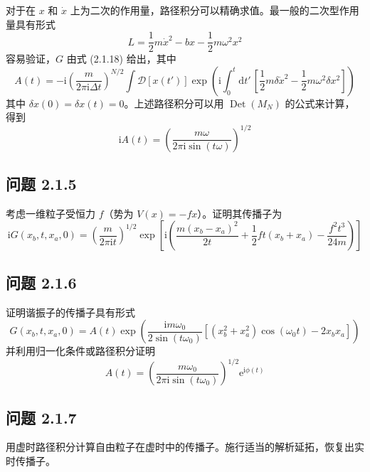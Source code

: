 对于在 $x$ 和 $\dot{x}$ 上为二次的作用量，路径积分可以精确求值。最一般的二次型作用量具有形式
\begin{equation*}
L=\frac{1}{2}m\dot{x}^2-bx-\frac{1}{2}m\omega^2x^2
\end{equation*}
容易验证，$G$ 由式 (2.1.18) 给出，其中
\begin{equation*}
A(t)=-\mathrm{i}\left(\frac{m}{2\pi\mathrm{i}\Delta t}\right)^{N/2}\int \mathcal{D}[x(t')]\exp\left(\mathrm{i}\int_0^t\mathrm{d}t'\,\left[\frac{1}{2}m\delta\dot{x}^2-\frac{1}{2}m\omega^2\delta x^2\right]\right)
\end{equation*}
其中 $\delta x(0)=\delta x(t)=0$。上述路径积分可以用 $\operatorname{Det}(M_N)$ 的公式来计算，得到
\begin{equation*}
\mathrm{i}A(t)=\left(\frac{m\omega}{2\pi\mathrm{i}\sin(t\omega)}\right)^{1/2}\tag{2.1.19}
\end{equation*}

\subsection*{问题 2.1.5}

考虑一维粒子受恒力 $f$（势为 $V(x)=-fx$）。证明其传播子为
\begin{equation*}
\mathrm{i}G(x_b,t,x_a,0)=\left(\frac{m}{2\pi\mathrm{i}t}\right)^{1/2}\exp\left[\mathrm{i}\left(\frac{m(x_b-x_a)^2}{2t}+\frac{1}{2}ft(x_b+x_a)-\frac{f^2t^3}{24m}\right)\right]
\end{equation*}

\subsection*{问题 2.1.6}

证明谐振子的传播子具有形式
\begin{equation*}
G(x_b,t,x_a,0)=A(t)\exp\left(\frac{\mathrm{i}m\omega_0}{2\sin(t\omega_0)}\left[(x_b^2+x_a^2)\cos(\omega_0 t)-2x_bx_a\right]\right)
\end{equation*}
并利用归一化条件或路径积分证明
\begin{equation*}
A(t)=\left(\frac{m\omega_0}{2\pi\mathrm{i}\sin(t\omega_0)}\right)^{1/2}\mathrm{e}^{\mathrm{i}\phi(t)}
\end{equation*}

\subsection*{问题 2.1.7}

用虚时路径积分计算自由粒子在虚时中的传播子。施行适当的解析延拓，恢复出实时传播子。

